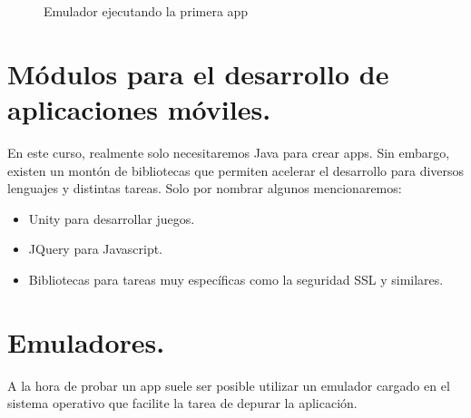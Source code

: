 \documentclass[a4paper,12pt,spanish]{sphinxmanual}
\begin{document}
\begin{figure}[htbp]
\centering
\capstart

\caption{Emulador ejecutando la primera app}\end{figure}


\section{Módulos para el desarrollo de aplicaciones móviles.}
\label{tema1:modulos-para-el-desarrollo-de-aplicaciones-moviles}
En este curso, realmente solo necesitaremos Java para crear apps. Sin embargo, existen un montón de bibliotecas que permiten acelerar el desarrollo para diversos lenguajes y distintas tareas. Solo por nombrar algunos mencionaremos:
\begin{itemize}
\item {} 
Unity para desarrollar juegos.

\item {} 
JQuery para Javascript.

\item {} 
Bibliotecas para tareas muy específicas como la seguridad SSL y similares.

\end{itemize}


\section{Emuladores.}
\label{tema1:emuladores}
A la hora de probar un app suele ser posible utilizar un emulador cargado en el sistema operativo que facilite la tarea de depurar la aplicación.
\end{document}
